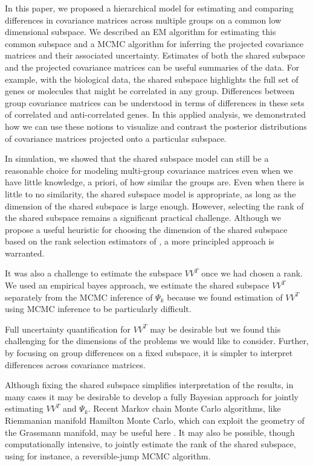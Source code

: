 \documentclass[12pt]{article}
\begin{document}
In this paper, we proposed a hierarchical model for estimating and
comparing differences in covariance matrices across multiple groups on
a common low dimensional subspace.  We described an EM algorithm for
estimating this common subspace and a MCMC algorithm for inferring the
projected covariance matrices and their associated uncertainty.
Estimates of both the shared subspace and the projected covariance
matrices can be useful summaries of the data.  For example, with the
biological data, the shared subspace highlights the full set of genes
or molecules that might be correlated in any group.  Differences between
group covariance matrices can be understood in terms of differences in
these sets of correlated and anti-correlated genes.  In this applied
analysis, we demonstrated how we can use these notions to visualize
and contrast the posterior distributions of covariance matrices
projected onto a particular subspace.

In simulation, we showed that the shared subspace model can
still be a reasonable choice for modeling multi-group covariance
matrices even when we have little knowledge, a priori, of how similar
the groups are.  Even when there is little to no similarity, the shared
subspace model is appropriate, as long as the dimension of the shared
subspace is large enough.  However, selecting the rank of the shared
subspace remains a significant practical challenge.  Although we
propose a useful heuristic for choosing the dimension of the shared
subspace based on the rank selection estimators of \citet{Gavish2014},
a more principled approach is warranted.  

It was also a challenge to estimate the subspace $VV^T$ once we had
chosen a rank.  We used an empirical bayes approach, we estimate the shared subspace
$VV^T$ separately from the MCMC inference of $\Psi_k$ because we found
estimation of $VV^T$ using MCMC inference to be
particularly difficult. 


Full uncertainty
quantification for $VV^T$ may be desirable but we found this
challenging for the dimensions of the problems we would like to
consider.  Further, by focusing on group differences on a fixed
subspace, it is simpler to interpret differences across covariance
matrices.  

 Although fixing the shared subspace
simplifies interpretation of the results, in many cases it may be
desirable to develop a fully Bayesian approach for jointly estimating
$VV^T$ and $\Psi_k$.  Recent Markov chain Monte Carlo algorithms, like
Riemmanian manifold Hamilton Monte Carlo, which can exploit the
geometry of the Grassmann manifold, may be useful here \citep{Byrne2013,
  Girolami2011}.  It may also be possible, though computationally
intensive, to jointly estimate the rank of the shared subspace, using
for instance, a reversible-jump MCMC algorithm.
\end{document}
